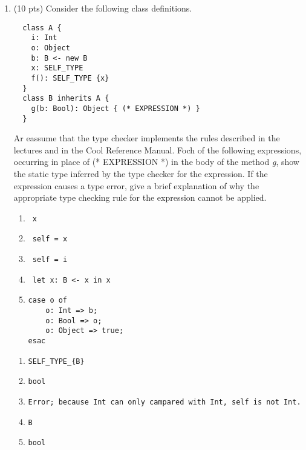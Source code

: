 \documentclass[10pt]{article}
\begin{document}
\begin{enumerate}
\item (10 pts) Consider the following class definitions.
\begin{verbatim}
  class A {
    i: Int
    o: Object
    b: B <- new B
    x: SELF_TYPE
    f(): SELF_TYPE {x}
  }
  class B inherits A {
    g(b: Bool): Object { (* EXPRESSION *) }
  }
\end{verbatim}

Ar eassume that the type checker implements the rules described in the lectures and in the Cool Reference
Manual. Foch of the following expressions, occurring in place of (* EXPRESSION *) in the body
of the method \emph{g}, show the static type inferred by the type checker for the expression. If the expression
causes a type error, give a brief explanation of why the appropriate type checking rule for the expression
cannot be applied.

\begin{enumerate}
  \item \begin{verbatim} x \end{verbatim}
  \item \begin{verbatim} self = x \end{verbatim}
  \item \begin{verbatim} self = i \end{verbatim}
  \item \begin{verbatim} let x: B <- x in x \end{verbatim}
  \item \begin{verbatim}
case o of
    o: Int => b;
    o: Bool => o;
    o: Object => true;
esac
\end{verbatim}
\end{enumerate}
\begin{enumerate}
\item \begin{verbatim}SELF_TYPE_{B} \end{verbatim}
\item \begin{verbatim}bool \end{verbatim}
\item \begin{verbatim}Error; because Int can only campared with Int, self is not Int.\end{verbatim}
\item \begin{verbatim}B\end{verbatim}
\item \begin{verbatim}bool\end{verbatim}
\end{enumerate}
\medskip


\end{enumerate}
\end{document}
